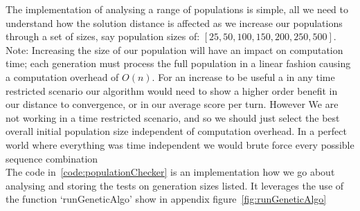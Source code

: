 The implementation of analysing a range of populations is simple, all we need to understand how the solution distance is affected as we increase our populations through a set of sizes, say population sizes of: \([25,50,100,150,200,250,500]\).\\

Note: Increasing the size of our population will have an impact on computation time; each generation must process the full population in a linear fashion causing a computation overhead of \(O(n)\). 
For an increase to be useful a in any time restricted scenario our algorithm would need to show a higher order benefit in our distance to convergence, or in our average score per turn.
However We are not working in a time restricted scenario, and so we should just select the best overall initial population size independent of computation overhead.
In a perfect world where everything was time independent we would brute force every possible sequence combination\\

The code in~\ref{code:populationChecker} is an implementation how we go about analysing and storing the tests on generation sizes listed. It leverages the use of the function `runGeneticAlgo' show in appendix figure~\ref{fig:runGeneticAlgo} \\

